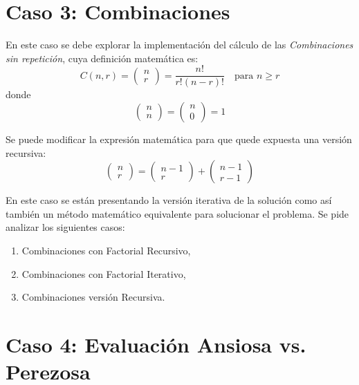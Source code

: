 \documentclass[a4paper,11pt]{article}
\begin{document}
\section*{Caso 3: Combinaciones}

En este caso se debe explorar la implementación del cálculo de las
\emph{Combinaciones sin repetición}, cuya definición matemática es:
\begin{equation*}
    C(n, r) = \begin{pmatrix} n \\ r \end{pmatrix} = \frac{n!}{r!(n-r)!} \quad \text{para } n \geq r
\end{equation*}
donde
\begin{equation*}
    \begin{pmatrix}
        n \\ n
    \end{pmatrix} =
    \begin{pmatrix}
        n \\ 0
    \end{pmatrix} = 1    
\end{equation*}

Se puede modificar la expresión matemática para que quede expuesta una versión
recursiva:
\begin{equation*}
    \begin{pmatrix} n \\ r \end{pmatrix} =
    \begin{pmatrix}
        n - 1 \\ r
    \end{pmatrix} +
    \begin{pmatrix}
        n - 1 \\ r - 1
    \end{pmatrix}
\end{equation*}

En este caso se están presentando la versión iterativa de la solución como
así también un método matemático equivalente para solucionar el problema.
Se pide analizar los siguientes casos:
\begin{enumerate}
    \item Combinaciones con Factorial Recursivo,
    \item Combinaciones con Factorial Iterativo,
    \item Combinaciones versión Recursiva.
\end{enumerate}


\section*{Caso 4: Evaluación Ansiosa vs. Perezosa}
\end{document}
